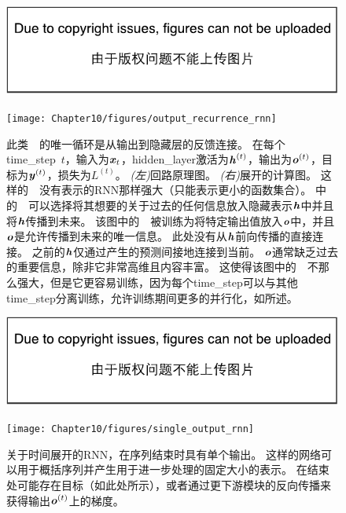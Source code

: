 \begin{figure}[!htb]
\ifOpenSource
\centerline{\includegraphics{figure.pdf}}
\else
\centerline{\texttt{[image: Chapter10/figures/output\_recurrence\_rnn]}}
\fi
\caption{此类~~的唯一循环是从输出到隐藏层的反馈连接。
在每个\gls{time_step}~$t$，输入为$\boldsymbol{\mathit{x}}_t$，\gls{hidden_layer}激活为$\boldsymbol{\mathit{h}}^{(t)}$，输出为$\boldsymbol{\mathit{o}}^{(t)}$，目标为$\boldsymbol{\mathit{y}}^{(t)}$，损失为$L^{(t)}$。
\emph{(左)}回路原理图。
\emph{(右)}展开的计算图。
这样的~~没有表示的RNN那样强大（只能表示更小的函数集合）。
中的~~可以选择将其想要的关于过去的任何信息放入隐藏表示$\boldsymbol{\mathit{h}}$中并且将$\boldsymbol{\mathit{h}}$传播到未来。
该图中的~~被训练为将特定输出值放入$\boldsymbol{\mathit{o}}$中，并且$\boldsymbol{\mathit{o}}$是允许传播到未来的唯一信息。
此处没有从$\boldsymbol{\mathit{h}}$前向传播的直接连接。
之前的$\boldsymbol{\mathit{h}}$仅通过产生的预测间接地连接到当前。
$\boldsymbol{\mathit{o}}$通常缺乏过去的重要信息，除非它非常高维且内容丰富。
这使得该图中的~~不那么强大，但是它更容易训练，因为每个\gls{time_step}可以与其他\gls{time_step}分离训练，允许训练期间更多的并行化，如所述。
}
\label{fig:chap10_output_recurrence_rnn}
\end{figure}

\begin{figure}[!htb]
\ifOpenSource
\centerline{\includegraphics{figure.pdf}}
\else
\centerline{\texttt{[image: Chapter10/figures/single\_output\_rnn]}}
\fi
\caption{关于时间展开的\gls{RNN}，在序列结束时具有单个输出。
这样的网络可以用于概括序列并产生用于进一步处理的固定大小的表示。
在结束处可能存在目标（如此处所示），或者通过更下游模块的反向传播来获得输出$\boldsymbol{\mathit{o}}^{(t)}$上的梯度。
}
\label{fig:chap10_single_output_rnn}
\end{figure}

